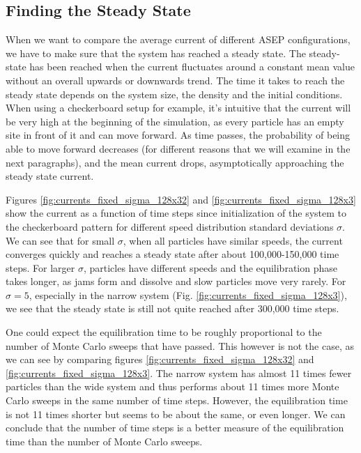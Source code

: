 \subsection{Finding the Steady State}

When we want to compare the average current of different ASEP configurations, we have to make sure that the system has reached a steady state. The steady-state has been reached when the current fluctuates around a constant mean value without an overall upwards or downwards trend. The time it takes to reach the steady state depends on the system size, the density and the initial conditions. When using a checkerboard setup for example, it's intuitive that the current will be very high at the beginning of the simulation, as every particle has an empty site in front of it and can move forward. As time passes, the probability of being able to move forward decreases (for different reasons that we will examine in the next paragraphs), and the mean current drops, asymptotically approaching the steady state current.


Figures \ref{fig:currents_fixed_sigma_128x32} and \ref{fig:currents_fixed_sigma_128x3} show the current as a function of time steps since initialization of the system to the checkerboard pattern for different speed distribution standard deviations $\sigma$. We can see that for small $\sigma$, when all particles have similar speeds, the current converges quickly and reaches a steady state after about 100,000-150,000 time steps. For larger $\sigma$, particles have different speeds and the equilibration phase takes longer, as jams form and dissolve and slow particles move very rarely. For $\sigma = 5$, especially in the narrow system (Fig. \ref{fig:currents_fixed_sigma_128x3}), we see that the steady state is still not quite reached after 300,000 time steps. 


One could expect the equilibration time to be roughly proportional to the number of Monte Carlo sweeps that have passed. This however is not the case, as we can see by comparing figures \ref{fig:currents_fixed_sigma_128x32} and \ref{fig:currents_fixed_sigma_128x3}. The narrow system has almost 11 times fewer particles than the wide system and thus performs about 11 times more Monte Carlo sweeps in the same number of time steps. However, the equilibration time is not 11 times shorter but seems to be about the same, or even longer. We can conclude that the number of time steps is a better measure of the equilibration time than the number of Monte Carlo sweeps.


